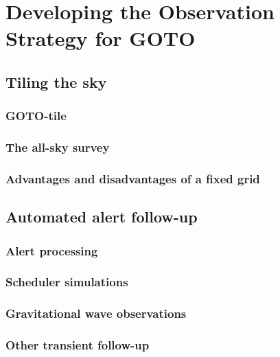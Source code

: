 \chapter{Developing the Observation Strategy for GOTO}
\label{chap:strategy}
\chaptoc{}

\newpage
\section{Tiling the sky}
\label{sec:tiling}

\lipsum{}

\subsection{GOTO-tile}
\label{sec:gototile}

\lipsum{}

\subsection{The all-sky survey}
\label{sec:survey}

\lipsum{}

\subsection{Advantages and disadvantages of a fixed grid}
\label{sec:fixed_grid}

\lipsum{}

\newpage
\section{Automated alert follow-up}
\label{sec:followup}

\lipsum{}

\subsection{Alert processing}
\label{sec:alerts}

\lipsum{}

\subsection{Scheduler simulations}
\label{sec:simulations}

\lipsum{}

\subsection{Gravitational wave observations}
\label{sec:gw_followup}

\lipsum{}

\subsection{Other transient follow-up}
\label{sec:other_followup}

\lipsum{}
